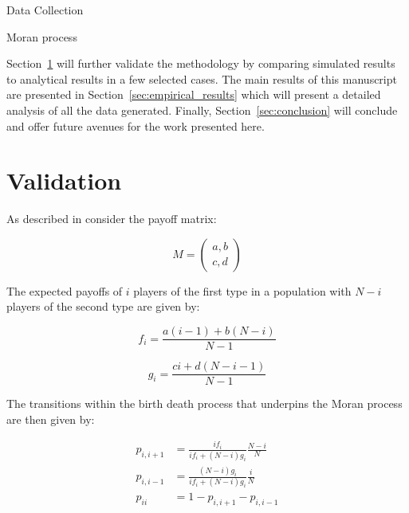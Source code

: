 \documentclass[10pt,journal]{IEEEtran}
\begin{document}
\begin{algorithm}[!hbtp]
        \caption{Data Collection}
        \label{alg:data_collection}
        
\end{algorithm}

\begin{algorithm}[!hbtp]
        \caption{Moran process}
        \label{alg:moran_process}
        
\end{algorithm}

Section~\ref{sec:validation} will further validate the methodology by comparing
simulated results to analytical results in a few selected cases. The main 
results of this
manuscript are presented in Section~\ref{sec:empirical_results} which will
present a detailed analysis of all the data generated. Finally,
Section~\ref{sec:conclusion} will conclude and offer future avenues for the work
presented here.


\section{Validation}\label{sec:validation}

As described in \cite{Nowak} consider the payoff matrix:

\begin{equation}\label{equ:payoff_matrix}
    M = \begin{pmatrix}
        a, b\\
        c, d
        \end{pmatrix}
\end{equation}

The expected payoffs of \(i\) players of the first type in a population with \(N
- i\) players of the second type are given by:

\begin{equation}\label{equ:expected_payoff_one}
    f_i = \frac{a(i - 1) + b(N - i)}{N - 1}
\end{equation}

\begin{equation}\label{equ:expected_payoff_two}
    g_i = \frac{ci + d(N - i - 1)}{N - 1}
\end{equation}

The transitions within the birth death process that underpins the Moran process
are then given by:

\begin{align}
    p_{i, i+1}&= \frac{if_i}{if_i+(N-i)g_i}\frac{N-i}{N}\label{equ:p_up}\\
    p_{i, i-1}&= \frac{(N-i)g_i}{if_i+(N-i)g_i}\frac{i}{N}\label{equ:p_down}\\
    p_{ii} &= 1 - p_{i, i+1} - p_{i, i-1}\label{equ:p_stay}
\end{align}
\end{document}
